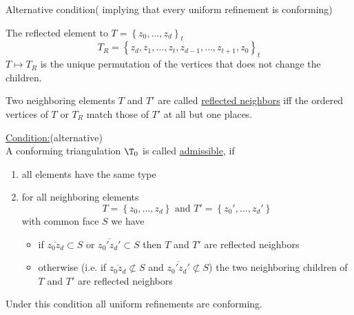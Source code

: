 Alternative condition( implying that every uniform refinement is conforming)
\begin{definition}
	The reflected element to $T= \left\{ z_{0},\dots ,z_{d} \right\}_{t}$
	\begin{equation*}
		T_{R}= \left\{ z_{d}, z_{1},\dots ,z_{t},z_{d-1},\dots ,z_{t+1},z_{0} \right\}_{t}
	\end{equation*}
	$T \mapsto T_{R}$ is the unique permutation of the vertices that does not change the children.
\end{definition}
\begin{definition}
	Two neighboring elements $T$ and $T'$ are called \underline{reflected neighbors} iff the ordered vertices of $T$ or $T_{R}$ match those of $T'$ at all but one places.
\end{definition}
\underline{Condition:}(alternative)\\
A conforming triangulation $\T_{0}$ is called \underline{admissible}, if
\begin{enumerate}[label = \arabic*)]
	\item all elements have the same type
	\item for all neighboring elements 
		\begin{equation*}
			T = \left\{ z_{0},\dots ,z_{d} \right\} \text{ and } T' = \left\{ z_{0}',\dots ,z_{d}' \right\}
		\end{equation*}
		with common face $S$ we have 
		\begin{itemize}
			\item if  $\overline{z_{0}z_{d}}\subset  S$ or $\overline{z_{0}'z_{d}'}\subset S$ then $T$ and $T'$ are reflected neighbors
			\item otherwise (i.e. if $\overline{z_{0}z_{d}}\not\subset  S$ and $\overline{z_{0}'z_{d}'}\not\subset S$) the two neighboring children of $T$ and $T'$ are reflected neighbors
		\end{itemize}
	
\end{enumerate}
\begin{theorem}
	Under this condition all uniform refinements are conforming.
\end{theorem}
